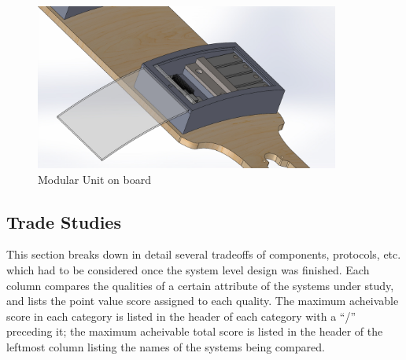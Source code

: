 \documentclass[titlepage, letterpaper,12pt]{article}
\begin{document}
\begin{figure}[!h]
    \centering
    \includegraphics[width=10cm]{figs/ModularAssembledZoomModOpen.JPG}
    \caption{Modular Unit on board}
    \label{fig:picTiny2}
\end{figure}


\subsection{Trade Studies}
This section breaks down in detail several tradeoffs of components, protocols, etc. which had to be considered once the system level design was finished. Each column compares the qualities of a certain attribute of the systems under study, and lists the point value score assigned to each quality. The maximum acheivable score in each category is listed in the header of each category with a ``/'' preceding it; the maximum acheivable total score is listed in the header of the leftmost column listing the names of the systems being compared.
\end{document}
